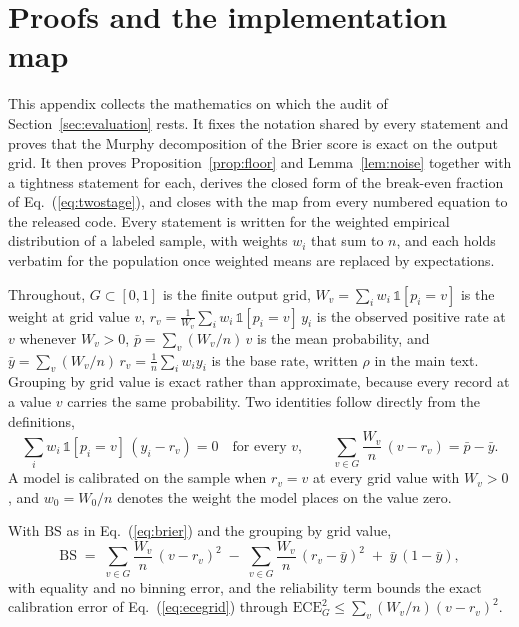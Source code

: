 \FloatBarrier
\section{Proofs and the implementation map}
\label{app:proofs}
\setcounter{table}{0}\setcounter{figure}{0}\setcounter{equation}{0}
\appendixtheorems

This appendix collects the mathematics on which the audit of Section~\ref{sec:evaluation}
rests. It fixes the notation shared by every statement and proves that the Murphy
decomposition of the Brier score is exact on the output grid. It then proves
Proposition~\ref{prop:floor} and Lemma~\ref{lem:noise} together with a tightness statement
for each, derives the closed form of the break-even fraction of Eq.~(\ref{eq:twostage}), and
closes with the map from every numbered equation to the released code. Every statement is written for the weighted empirical
distribution of a labeled sample, with weights $w_i$ that sum to $n$, and each holds verbatim
for the population once weighted means are replaced by expectations.

Throughout, $G \subset [0,1]$ is the finite output grid, $W_v = \sum_i w_i\,\mathbb{1}[p_i = v]$
is the weight at grid value $v$, $r_v = \frac{1}{W_v}\sum_i w_i\,\mathbb{1}[p_i = v]\,y_i$ is the
observed positive rate at $v$ whenever $W_v > 0$, $\bar{p} = \sum_v (W_v/n)\,v$ is the mean
probability, and $\bar{y} = \sum_v (W_v/n)\,r_v = \frac{1}{n}\sum_i w_i y_i$ is the base rate,
written $\rho$ in the main text. Grouping by grid value is exact rather than approximate,
because every record at a value $v$ carries the same probability. Two identities follow
directly from the definitions,
\begin{equation}
\sum_i w_i\,\mathbb{1}[p_i = v]\,(y_i - r_v) = 0 \quad\text{for every } v,\qquad
\sum_{v \in G} \frac{W_v}{n}\,(v - r_v) = \bar{p} - \bar{y}.
\label{eq:app-ident}
\end{equation}
A model is calibrated on the sample when $r_v = v$ at every grid value with $W_v > 0$, and
$w_0 = W_0/n$ denotes the weight the model places on the value zero.

\begin{lemma}
\label{lem:murphy}
With $\mathrm{BS}$ as in Eq.~(\ref{eq:brier}) and the grouping by grid value,
\begin{equation}
\mathrm{BS} \;=\; \sum_{v \in G} \frac{W_v}{n}\,(v - r_v)^2
\;-\; \sum_{v \in G} \frac{W_v}{n}\,(r_v - \bar{y})^2 \;+\; \bar{y}\,(1 - \bar{y}),
\label{eq:app-murphy}
\end{equation}
with equality and no binning error, and the reliability term bounds the exact calibration
error of Eq.~(\ref{eq:ecegrid}) through $\mathrm{ECE}_G^2 \le \sum_v (W_v/n)(v - r_v)^2$.
\end{lemma}

